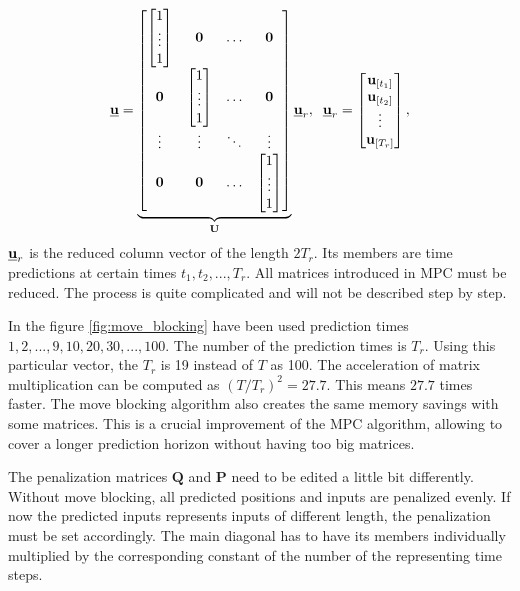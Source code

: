 \documentclass[a4paper,11pt,titlepage]{article}
\newcommand{\uvec}{\textbf{\underline{u}}}
\newcommand{\urvec}{\textbf{\underline{u}}_r}
\begin{document}
\begin{equation}
\uvec = \underbrace{\begin{bmatrix}
\begin{bmatrix}
1\\
\vdots\\
1
\end{bmatrix} & \textbf{0} & \hdots & \textbf{0} \\
\textbf{0} & \begin{bmatrix}
1\\
\vdots\\
1
\end{bmatrix} & \hdots & \textbf{0}\\
\vdots & \vdots & \ddots & \vdots \\
\textbf{0} & \textbf{0} & \hdots & \begin{bmatrix}
1\\
\vdots\\
1
\end{bmatrix}
\end{bmatrix}}_{\textbf{U}}\urvec, \;\;
\urvec = \begin{bmatrix}
\textbf{u}_{[t_1]} \\
\textbf{u}_{[t_2]} \\
\vdots \\
\textbf{u}_{[T_r]}
\end{bmatrix},
\label{eq:moveblocking_example}
\end{equation}
$\urvec$ is the reduced column vector of the length $2T_r$. Its members are time predictions at certain times $t_1, t_2, ..., T_r$. All matrices introduced in MPC must be reduced. The process is quite complicated and will not be described step by step. 

In the figure \ref{fig:move_blocking} have been used prediction times $1, 2, ..., 9, 10, 20, 30, ..., 100$. The number of the prediction times is $T_r$. Using this particular vector, the $T_r$ is 19 instead of $T$ as 100. The acceleration of matrix multiplication can be computed as $(T/T_r)^2 = 27.7$. This means $27.7$ times faster. The move blocking algorithm also creates the same memory savings with some matrices. This is a crucial improvement of the MPC algorithm, allowing to cover a longer prediction horizon without having too big matrices.

The penalization matrices $\textbf{Q}$ and $\textbf{P}$ need to be edited a little bit differently. Without move blocking, all predicted positions and inputs are penalized evenly. If now the predicted inputs represents inputs of different length, the penalization must be set accordingly. The main diagonal has to have its members individually multiplied by the corresponding constant of the number of the representing time steps. 
\end{document}
